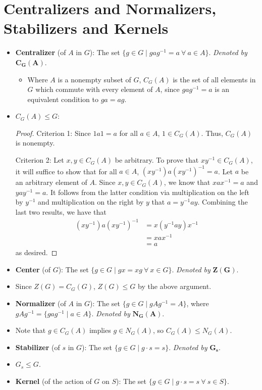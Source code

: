 \documentclass[../notes.tex]{subfiles}
\begin{document}
\section{Centralizers and Normalizers, Stabilizers and Kernels}
\begin{itemize}
    \item \textbf{Centralizer} (of $A$ in $G$): The set $\{g\in G\mid gag^{-1}=a\ \forall\ a\in A\}$. \emph{Denoted by} $\bm{C_G(A)}$.
    \begin{itemize}
        \item Where $A$ is a nonempty subset of $G$, $C_G(A)$ is the set of all elements in $G$ which commute with every element of $A$, since $gag^{-1}=a$ is an equivalent condition to $ga=ag$.
    \end{itemize}
    \item $C_G(A)\leq G$:
    \begin{proof}
        Criterion 1: Since $1a1=a$ for all $a\in A$, $1\in C_G(A)$. Thus, $C_G(A)$ is nonempty.\par
        Criterion 2: Let $x,y\in C_G(A)$ be arbitrary. To prove that $xy^{-1}\in C_G(A)$, it will suffice to show that for all $a\in A$, $(xy^{-1})a(xy^{-1})^{-1}=a$. Let $a$ be an arbitrary element of $A$. Since $x,y\in C_G(A)$, we know that $xax^{-1}=a$ and $yay^{-1}=a$. It follows from the latter condition via multiplication on the left by $y^{-1}$ and multiplication on the right by $y$ that $a=y^{-1}ay$. Combining the last two results, we have that
        \begin{align*}
            (xy^{-1})a(xy^{-1})^{-1} &= x(y^{-1}ay)x^{-1}\\
            &= xax^{-1}\\
            &= a
        \end{align*}
        as desired.
    \end{proof}
    \item \textbf{Center} (of $G$): The set $\{g\in G\mid gx=xg\ \forall\ x\in G\}$. \emph{Denoted by} $\bm{Z(G)}$.
    \item Since $Z(G)=C_G(G)$, $Z(G)\leq G$ by the above argument.
    \item \textbf{Normalizer} (of $A$ in $G$): The set $\{g\in G\mid gAg^{-1}=A\}$, where $gAg^{-1}=\{gag^{-1}\mid a\in A\}$. \emph{Denoted by} $\bm{N_G(A)}$.
    \item Note that $g\in C_G(A)$ implies $g\in N_G(A)$, so $C_G(A)\leq N_G(A)$.
    \item {}\textbf{Stabilizer} (of $s$ in $G$): The set $\{g\in G\mid g\cdot s=s\}$. \emph{Denoted by} $\bm{G_s}$.
    \item $G_s\leq G$.
    \item \textbf{Kernel} (of the action of $G$ on $S$): The set $\{g\in G\mid g\cdot s=s\ \forall\ s\in S\}$.
\end{itemize}
\end{document}
